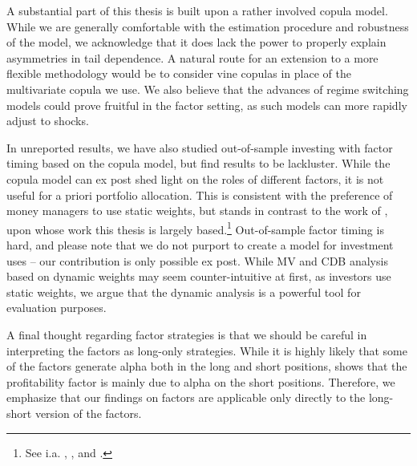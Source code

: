 A substantial part of this thesis is built upon a rather involved copula model. While we are generally comfortable with the estimation procedure and robustness of the model, we acknowledge that it does lack the power to properly explain asymmetries in tail dependence. A natural route for an extension to a more flexible methodology would be to consider vine copulas in place of the multivariate copula we use. We also believe that the advances of regime switching models could prove fruitful in the factor setting, as such models can more rapidly adjust to shocks.

In unreported results, we have also studied out-of-sample investing with factor timing based on the copula model, but find results to be lackluster. While the copula model can ex post shed light on the roles of different factors, it is not useful for a priori portfolio allocation. This is consistent with the preference of money managers to use static weights, but stands in contrast to the work of \textcite{ChristoffersenLanglois2013}, upon whose work this thesis is largely based.\footnote{See i.a. \textcite{AQRSiren}, \textcite{BlackRock}, \textcite{MSCI} and \textcite{Robeco}.} Out-of-sample factor timing is hard, and please note that we do not purport to create a model for investment uses -- our contribution is only possible ex post. While MV and CDB analysis based on dynamic weights may seem counter-intuitive at first, as investors use static weights, we argue that the dynamic analysis is a powerful tool for evaluation purposes.

A final thought regarding factor strategies is that we should be careful in interpreting the factors as long-only strategies. While it is highly likely that some of the factors generate alpha both in the long and short positions, \textcite{Wang2013} shows that the profitability factor is mainly due to alpha on the short positions. Therefore, we emphasize that our findings on factors are applicable only directly to the long-short version of the factors.
